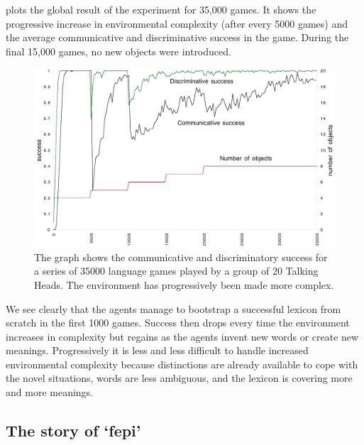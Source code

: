  plots the global 
result of the experiment for 35,000 games. It shows the progressive 
increase in environmental complexity (after every 
5000 games) and the average communicative and discriminative
success in the game. During the final 15,000 games, no new
objects were introduced. 

\begin{figure}[htbp]
  \centerline{\includegraphics[width=.80\textwidth]{chap7/figs/globalsuccess.pdf}}
\caption{\label{globalsuccess}The graph shows the communicative
and discriminatory success for a series of 35000 language games
played by a group of 20 Talking Heads. The environment 
has progressively been made more complex.}
\end{figure}

We see clearly that the agents manage to bootstrap 
a successful lexicon from scratch in the first 1000 
games. Success then drops every time
the environment increases in complexity but regains as the 
agents invent new words or create new meanings. Progressively 
it is less and less difficult to handle increased
environmental complexity because distinctions are 
already available to cope with the novel
situations, words are less ambiguous, 
and the lexicon is covering more and more meanings. 

\subsection{The story of `fepi'}

